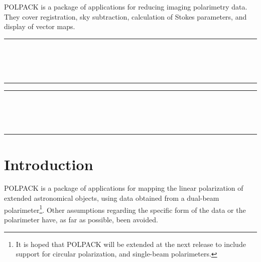 POLPACK is a package of applications for reducing imaging polarimetry data. 
They cover registration, sky subtraction, calculation of Stokes
parameters, and display of vector maps.

 \begin{latexonly}
   \newpage
   \markright{\stardocname}
   \null\vspace{5mm}
   \begin {center}
   \rule{80mm}{0.5mm} \\ [1ex]
   {\Large\bf \stardoctitle \\ [2.5ex]
    \normalsize \stardocversion} \\ [2ex]
   \rule{80mm}{0.5mm}
   \end{center}
   \setlength{\parskip}{0mm}
   \latexonlytoc
   \setlength{\parskip}{\medskipamount}
 \end{latexonly}
\newpage
\renewcommand{\thepage}{\arabic{page}}
\setcounter{page}{1}
\begin{latexonly}
  \begin {center}
     \rule{80mm}{0.5mm} \\ [1ex]
     {\Large\bf   \stardoctitle \\ [2.5ex]
      \normalsize \stardocversion} \\ [2ex]
    \rule{80mm}{0.5mm}
  \end{center}
\end{latexonly}

\section{Introduction}
POLPACK is a package of applications for mapping the linear polarization
of extended astronomical objects, using data obtained from a dual-beam
polarimeter\footnote{It is hoped that POLPACK will be extended at the
next release to include support for circular polarization, and
single-beam polarimeters.}. Other assumptions regarding the specific form
of the data or the polarimeter have, as far as possible, been avoided.

